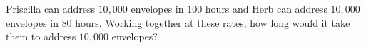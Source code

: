 Priscilla can address $10{,}000$ envelopes in $100$ hours and Herb can address $10{,}000$ envelopes in $80$ hours. Working together at these rates, how long would it take them to address $10{,}000$ envelopes?
